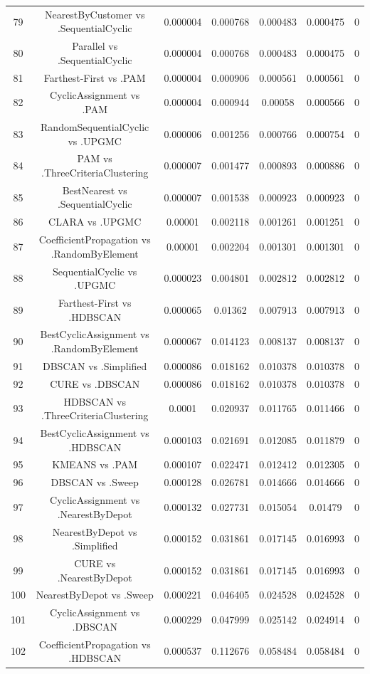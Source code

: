 \documentclass[a4paper,10pt]{article}
\begin{document}
\begin{landscape}
\begin{table}[!htp]
\begin{tabular}{ccccccc}
79&NearestByCustomer vs .SequentialCyclic&0.000004&0.000768&0.000483&0.000475&0\\
80&Parallel vs .SequentialCyclic&0.000004&0.000768&0.000483&0.000475&0\\
81&Farthest-First vs .PAM&0.000004&0.000906&0.000561&0.000561&0\\
82&CyclicAssignment vs .PAM&0.000004&0.000944&0.00058&0.000566&0\\
83&RandomSequentialCyclic vs .UPGMC&0.000006&0.001256&0.000766&0.000754&0\\
84&PAM vs .ThreeCriteriaClustering&0.000007&0.001477&0.000893&0.000886&0\\
85&BestNearest vs .SequentialCyclic&0.000007&0.001538&0.000923&0.000923&0\\
86&CLARA vs .UPGMC&0.00001&0.002118&0.001261&0.001251&0\\
87&CoefficientPropagation vs .RandomByElement&0.00001&0.002204&0.001301&0.001301&0\\
88&SequentialCyclic vs .UPGMC&0.000023&0.004801&0.002812&0.002812&0\\
89&Farthest-First vs .HDBSCAN&0.000065&0.01362&0.007913&0.007913&0\\
90&BestCyclicAssignment vs .RandomByElement&0.000067&0.014123&0.008137&0.008137&0\\
91&DBSCAN vs .Simplified&0.000086&0.018162&0.010378&0.010378&0\\
92&CURE vs .DBSCAN&0.000086&0.018162&0.010378&0.010378&0\\
93&HDBSCAN vs .ThreeCriteriaClustering&0.0001&0.020937&0.011765&0.011466&0\\
94&BestCyclicAssignment vs .HDBSCAN&0.000103&0.021691&0.012085&0.011879&0\\
95&KMEANS vs .PAM&0.000107&0.022471&0.012412&0.012305&0\\
96&DBSCAN vs .Sweep&0.000128&0.026781&0.014666&0.014666&0\\
97&CyclicAssignment vs .NearestByDepot&0.000132&0.027731&0.015054&0.01479&0\\
98&NearestByDepot vs .Simplified&0.000152&0.031861&0.017145&0.016993&0\\
99&CURE vs .NearestByDepot&0.000152&0.031861&0.017145&0.016993&0\\
100&NearestByDepot vs .Sweep&0.000221&0.046405&0.024528&0.024528&0\\
101&CyclicAssignment vs .DBSCAN&0.000229&0.047999&0.025142&0.024914&0\\
102&CoefficientPropagation vs .HDBSCAN&0.000537&0.112676&0.058484&0.058484&0\\

\end{tabular}
\end{table}
\end{landscape}
\end{document}
